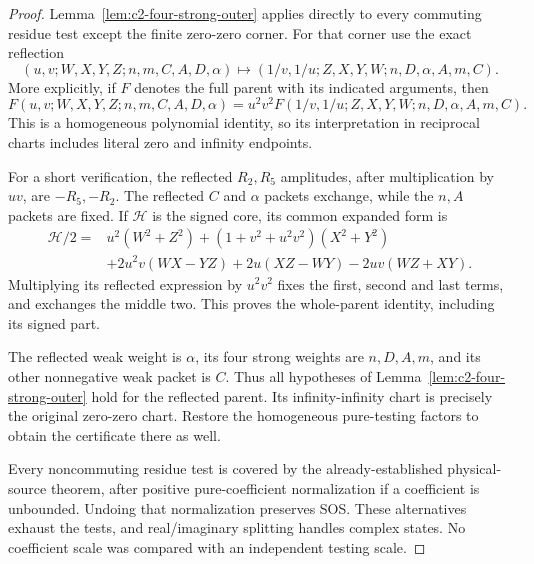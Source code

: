 \begin{proof}
Lemma~\ref{lem:c2-four-strong-outer} applies directly to every commuting
residue test except the finite zero-zero corner.
For that corner use the exact reflection
\begin{equation}
 (u,v;W,X,Y,Z;n,m,C,A,D,\alpha)
 \longmapsto
 (1/v,1/u;Z,X,Y,W;n,D,\alpha,A,m,C).
\label{eq:c2ms-reflection}
\end{equation}
More explicitly, if $F$ denotes the full parent with its indicated
arguments, then
\begin{equation}
 F(u,v;W,X,Y,Z;n,m,C,A,D,\alpha)
 =u^2v^2F(1/v,1/u;Z,X,Y,W;n,D,\alpha,A,m,C).
\label{eq:c2ms-reflection-identity}
\end{equation}
This is a homogeneous polynomial identity, so its interpretation in
reciprocal charts includes literal zero and infinity endpoints.

For a short verification, the reflected $R_2,R_5$ amplitudes, after
multiplication by $uv$, are $-R_5,-R_2$.  The reflected $C$ and
$\alpha$ packets exchange, while the $n,A$ packets are fixed.
If $\mathcal H$ is the signed core, its common expanded form is
\begin{align*}
 \mathcal H/2={}&u^2(W^2+Z^2)+(1+v^2+u^2v^2)(X^2+Y^2)\\
 &+2u^2v(WX-YZ)+2u(XZ-WY)-2uv(WZ+XY).
\end{align*}
Multiplying its reflected expression by $u^2v^2$ fixes the first,
second and last terms, and exchanges the middle two.  This proves the
whole-parent identity, including its signed part.

The reflected weak weight is $\alpha$, its four strong weights are
$n,D,A,m$, and its other nonnegative weak packet is $C$.
Thus all hypotheses of Lemma~\ref{lem:c2-four-strong-outer} hold for
the reflected parent.  Its infinity-infinity chart is precisely the
original zero-zero chart.  Restore the homogeneous pure-testing
factors to obtain the certificate there as well.

Every noncommuting residue test is covered by the already-established
physical-source theorem, after positive pure-coefficient normalization
if a coefficient is unbounded.  Undoing that normalization preserves
SOS.  These alternatives exhaust the tests, and real/imaginary splitting
handles complex states.  No coefficient scale was compared with an
independent testing scale.
\end{proof}

